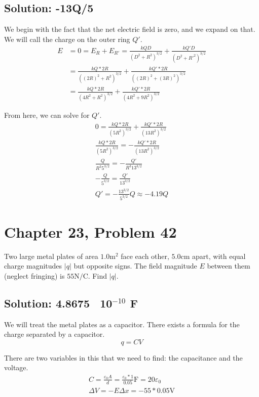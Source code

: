 \documentclass[12pt]{article}
\begin{document}
\subsection*{Solution: -13Q/5}
We begin with the fact that the net electric field is zero, and we expand on that.
We will call the charge on the outer ring $Q'$.
\begin{align*}
    E   &=  0
        =   E_R + E_{R'}
        =   \frac{kQD}{(D^2 + R^2)^{3/2}} + \frac{kQ'D}{(D^2 + R'^2)^{3/2}}\\
        &=  \frac{kQ*2R}{((2R)^2 + R^2)^{3/2}} + \frac{kQ'*2R}{((2R)^2 + (3R)^2)^{3/2}}\\
        &=  \frac{kQ*2R}{(4R^2 + R^2)^{3/2}} + \frac{kQ'*2R}{(4R^2 + 9R^2)^{3/2}}
\end{align*}

From here, we can solve for $Q'$.
\begin{gather*}
    0   =   \frac{kQ*2R}{(5R^2)^{3/2}} + \frac{kQ'*2R}{(13R^2)^{3/2}}\\
    \frac{kQ*2R}{(5R^2)^{3/2}}  =   -\frac{kQ'*2R}{(13R^2)^{3/2}}\\
    \frac{Q}{R^3 5^{3/2}}  =   -\frac{Q'}{R^3 13^{3/2}}\\
    -\frac{Q}{5^{3/2}}  =   \frac{Q'}{13^{3/2}}\\
    Q'  =   \boxed{-\frac{13^{3/2}}{5^{3/2}}Q \approx -4.19 Q}
\end{gather*}
\pagebreak
\section{Chapter 23, Problem 42}
Two large metal plates of area $1.0 \unit{\meter^2}$ face each other, $5.0 \unit{\centi\meter}$ apart, with equal charge magnitudes $|q|$ but opposite signs. The field magnitude $E$ between them (neglect fringing) is $55 \unit{\newton/\coulomb}$. Find $|q|$.

\subsection*{Solution: 4.8675 \texttimes\ 10$^{-10}$ F}
We will treat the metal plates as a capacitor.
There exists a formula for the charge separated by a capacitor.
\[
    q   =   CV
\]

There are two variables in this that we need to find: the capacitance and the voltage.
\begin{gather*}
    C   =   \frac{\varepsilon_0 A}{d} = \frac{\varepsilon_0 * 1}{0.05} \unit{\farad}
        =   20\varepsilon_0\\
    \Delta V    =   -E \Delta x
        =   -55 * 0.05 \unit{\volt}
\end{gather*}
\end{document}
